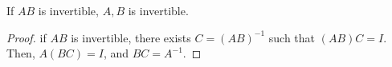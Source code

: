 
\begin{theorem}
	If \( AB \) is invertible, \( A,B \) is invertible.
\end{theorem}
\begin{proof}
	if \( AB \) is invertible, there exists \( C = (AB)^{-1}  \) such that \( (AB)C = I \). Then, \( A(BC) = I \), and \( BC = A^{-1}  \).
\end{proof}


